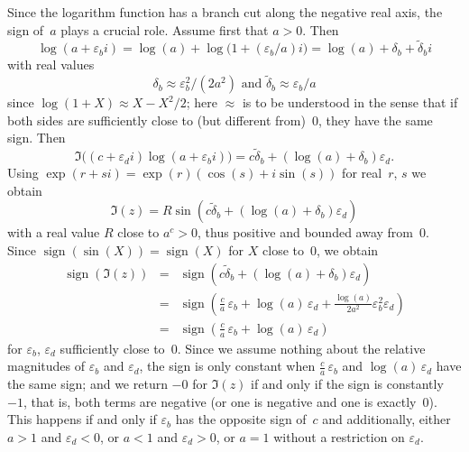 \documentclass [11pt]{article}
\renewcommand {\epsilon}{\varepsilon}
\newcommand {\sign}{\operatorname{sign}}
\begin{document}
Since the logarithm function has a branch cut along the negative real
axis, the sign of~$a$ plays a crucial role. Assume first that $a > 0$.
Then
\[
\log (a + \epsilon_b i)
= \log (a) + \log \big( 1 + (\epsilon_b/a) i \big)
= \log (a) + \delta_b + \tilde \delta_b i
\]
with real values
\[
\delta_b \approx \epsilon_b^2 / (2 a^2)
\text { and }
\tilde\delta_b \approx \epsilon_b / a
\]
since
$\log (1 + X) \approx X - X^2/2$;
here $\approx$ is to be understood in the sense that if both sides are
sufficiently close to (but different from)~$0$, they have the same sign.
Then
\[
\Im \big( (c + \epsilon_d i) \log (a + \epsilon_b i) \big)
=
c \tilde \delta_b + (\log (a) + \delta_b) \epsilon_d.
\]
Using $\exp (r + s i) = \exp (r) (\cos (s) + i \sin (s))$
for real~$r$, $s$ we obtain
\[
\Im (z)
= R
\sin \left( c \tilde \delta_b + (\log (a) + \delta_b) \epsilon_d \right)
\]
with a real value $R$ close to $a^c > 0$, thus positive and bounded
away from~$0$.
Since $\sign (\sin (X)) = \sign (X)$ for $X$ close to~$0$,
we obtain
\begin {eqnarray*}
\sign (\Im (z))
& = & \sign \left( c \tilde \delta_b + (\log (a) + \delta_b) \epsilon_d \right) \\
& = & \sign \left( \frac {c}{a} \, \epsilon_b + \log (a) \, \epsilon_d
+ \frac {\log (a)}{2 a^2} \epsilon_b^2 \epsilon_d \right) \\
& = & \sign \left( \frac {c}{a} \, \epsilon_b + \log (a) \, \epsilon_d \right)
\end {eqnarray*}
for $\epsilon_b$, $\epsilon_d$ sufficiently close to~$0$.
Since we assume nothing about the relative magnitudes of $\epsilon_b$ and
$\epsilon_d$, the sign is only constant when
$\frac {c}{a} \, \epsilon_b$ and $\log (a) \, \epsilon_d$ have the same sign;
and we return $-0$ for $\Im (z)$ if and only if the sign is
constantly~$-1$, that is, both terms are negative
(or one is negative and one is exactly~$0$).
This happens if and only if $\epsilon_b$ has the opposite sign of~$c$
and additionally,
either $a > 1$ and $\epsilon_d < 0$,
or     $a < 1$ and $\epsilon_d > 0$,
or     $a = 1$ without a restriction on $\epsilon_d$.
\end{document}
